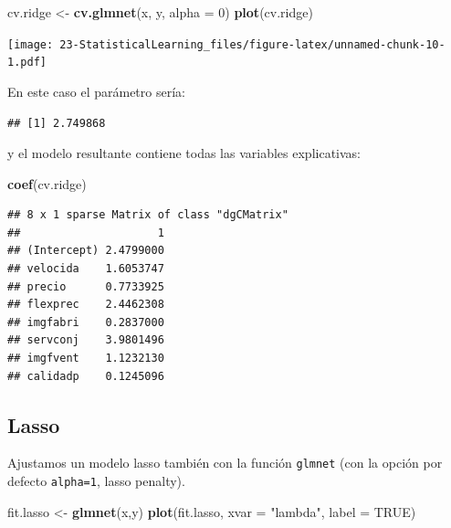 \documentclass[]{book}
\newenvironment{Shaded}{\begin{snugshade}}{\end{snugshade}}
\newcommand{\KeywordTok}[1]{\textcolor[rgb]{0.13,0.29,0.53}{\textbf{#1}}}
\newcommand{\DataTypeTok}[1]{\textcolor[rgb]{0.13,0.29,0.53}{#1}}
\newcommand{\DecValTok}[1]{\textcolor[rgb]{0.00,0.00,0.81}{#1}}
\newcommand{\StringTok}[1]{\textcolor[rgb]{0.31,0.60,0.02}{#1}}
\newcommand{\OtherTok}[1]{\textcolor[rgb]{0.56,0.35,0.01}{#1}}
\newcommand{\OperatorTok}[1]{\textcolor[rgb]{0.81,0.36,0.00}{\textbf{#1}}}
\newcommand{\NormalTok}[1]{#1}
\begin{document}
\begin{Shaded}
\begin{Highlighting}[]
\NormalTok{cv.ridge <-}\StringTok{ }\KeywordTok{cv.glmnet}\NormalTok{(x, y, }\DataTypeTok{alpha =} \DecValTok{0}\NormalTok{)}
\KeywordTok{plot}\NormalTok{(cv.ridge)}
\end{Highlighting}
\end{Shaded}

\texttt{[image: 23-StatisticalLearning\_files/figure-latex/unnamed-chunk-10-1.pdf]}

En este caso el parámetro sería:

\begin{Shaded}
\end{Shaded}

\begin{verbatim}
## [1] 2.749868
\end{verbatim}

y el modelo resultante contiene todas las variables explicativas:

\begin{Shaded}
\begin{Highlighting}[]
\KeywordTok{coef}\NormalTok{(cv.ridge)}
\end{Highlighting}
\end{Shaded}

\begin{verbatim}
## 8 x 1 sparse Matrix of class "dgCMatrix"
##                     1
## (Intercept) 2.4799000
## velocida    1.6053747
## precio      0.7733925
## flexprec    2.4462308
## imgfabri    0.2837000
## servconj    3.9801496
## imgfvent    1.1232130
## calidadp    0.1245096
\end{verbatim}

\subsection{Lasso}\label{lasso}

Ajustamos un modelo lasso también con la función \texttt{glmnet} (con la
opción por defecto \texttt{alpha=1}, lasso penalty).

\begin{Shaded}
\begin{Highlighting}[]
\NormalTok{fit.lasso <-}\StringTok{ }\KeywordTok{glmnet}\NormalTok{(x,y)}
\KeywordTok{plot}\NormalTok{(fit.lasso, }\DataTypeTok{xvar =} \StringTok{"lambda"}\NormalTok{, }\DataTypeTok{label =} \OtherTok{TRUE}\NormalTok{)}
\end{Highlighting}
\end{Shaded}
\end{document}
